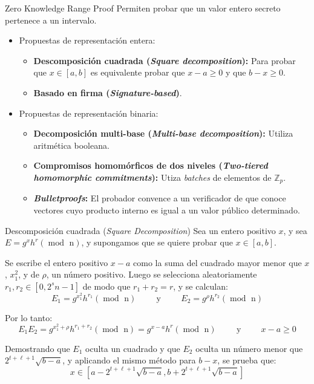 \documentclass[8pt,xcolor=dvipsnames]{beamer}
\begin{document}
\begin{frame}[fragile]{Zero Knowledge Range Proof}
    Permiten probar que un valor entero secreto pertenece a un intervalo.

    \begin{itemize}
        \item Propuestas de representación entera:
        \begin{itemize}
            \item \textbf{Descomposición cuadrada (\textit{Square decomposition}):} Para probar que $x \in [a, b]$ es equivalente probar que $x - a \geq 0$ y que $b - x \geq 0$.
            \item \textbf{Basado en firma (\textit{Signature-based})}.
        \end{itemize}
        \item Propuestas de representación binaria:
        \begin{itemize}
            \item \textbf{Decomposición multi-base (\textit{Multi-base decomposition}):} Utiliza aritmética booleana.
            \item \textbf{Compromisos homomórficos de dos niveles (\textit{Two-tiered homomorphic commitments}):} Utiza \textit{batches} de elementos de $\mathbb{Z}_{p}$.
            \item \textbf{\textit{Bulletproofs}:} El probador convence a un verificador de que conoce vectores cuyo producto interno es igual a un valor público determinado.
        \end{itemize}
    \end{itemize}

\end{frame}


\begin{frame}[fragile]{Descomposición cuadrada (\textit{Square Decomposition})}
    Sea un entero positivo $x$, y sea $E = g^{x}h^{r} (\operatorname{mod} \text{ n})$, y supongamos que se quiere probar que $x \in [a, b]$.

    Se escribe el entero positivo $x - a$ como la suma del cuadrado mayor menor que $x$, $x_{1}^{2}$, y de $\rho$, un número positivo. Luego se selecciona aleatoriamente $r_{1}, r_{2} \in [0, 2^{s}n-1]$ de modo que $r_{1} + r_{2} = r$, y se calculan:
    $$E_{1} = g^{x_{1}^{2}}h^{r_{1}} (\operatorname{mod} \text{ n}) \hspace{1cm} \text{y} \hspace{1cm} E_{2} = g^{\rho}h^{r_{2}} (\operatorname{mod} \text{ n})$$

    Por lo tanto:
    $$E_{1}E_{2} = g^{x_{1}^{2}+\rho}h^{r_{1}+r_{2}} (\operatorname{mod} \text{ n}) = g^{x-a}h^{r} (\operatorname{mod} \text{ n}) \hspace{1cm} \text{y} \hspace{1cm} x - a \geq 0$$

    Demostrando que $E_{1}$ oculta un cuadrado y que $E_{2}$ oculta un número menor que $2^{t+\ell+1}\sqrt{b-a}$, y aplicando el mismo método para $b - x$, se prueba que:
    $$x \in [a - 2^{t+\ell+1} \sqrt{b-a}, b + 2^{t+\ell+1} \sqrt{b-a}]$$
\end{frame}
\end{document}

